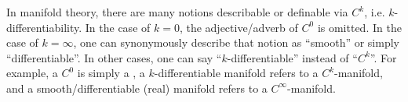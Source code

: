 \begin{convention} \label{convention:C_k_for_k_equal_0_means_continuous_whereas_C_k_for_k_equal_infty_means_smooth}
In manifold theory, there are many notions describable or definable via $C^k$, i.e. $k$-differentiability. In the case of $k = 0$, the adjective/adverb of $C^0$ is omitted. In the case of $k = \infty$, one can synonymously describe that notion as ``smooth'' or simply ``differentiable''. In other cases, one can say ``$k$-differentiable'' instead of ``$C^k$''. For example, a $C^0$ is simply a , a $k$-differentiable manifold refers to a $C^k$-manifold, and a smooth/differentiable (real) manifold refers to a $C^\infty$-manifold.
\end{convention}